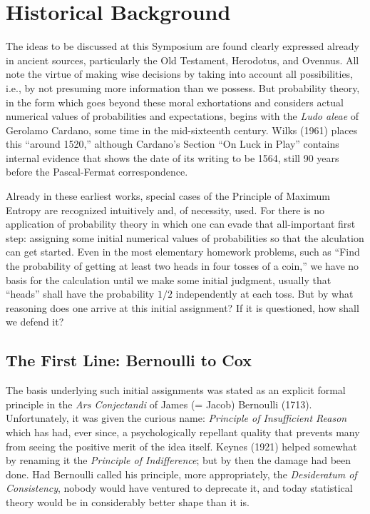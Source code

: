 \section{Historical Background}
\label{sec:A}
The ideas to be discussed at this Symposium are found clearly expressed already in ancient sources, particularly the Old Testament, Herodotus, and Ovennus.
All note the virtue of making wise decisions by taking into account all possibilities, i.e., by not presuming more information than we possess.
But probability theory, in the form which goes beyond these moral exhortations and considers actual numerical values of probabilities and expectations, begins with the \emph{Ludo aleae} of Gerolamo Cardano, some time in the mid-sixteenth century.
Wilks (\cite{wilks}{1961}) places this ``around 1520,'' although Cardano’s Section ``On Luck in Play'' contains internal evidence that shows the date of its writing to be 1564, still 90 years before the Pascal-Fermat correspondence.

Already in these earliest works, special cases of the Principle of Maximum Entropy are recognized intuitively and, of necessity, used.
For there is no application of probability theory in which one can evade that all-important first step: assigning some initial numerical values of probabilities so that the alculation can get started.
Even in the most elementary homework problems, such as ``Find the probability of getting at least two heads in four tosses of a coin,'' we have no basis for the calculation until we make some initial judgment, usually that ``heads'' shall have the probability $1/2$ independently at each toss.
But by what reasoning does one arrive at this initial assignment?
If it is questioned, how shall we defend it?

\subsection{The First Line: Bernoulli to Cox}
The basis underlying such initial assignments was stated as an explicit formal principle in the \emph{Ars Conjectandi} of James (= Jacob) Bernoulli (1713).
Unfortunately, it was given the curious name: \emph{Principle of Insufficient Reason} which has had, ever since, a psychologically repellant quality that prevents many from seeing the positive merit of the idea itself.
Keynes (\cite{keynes}{1921}) helped somewhat by renaming it the \emph{Principle of Indifference}; but by then the damage had been done.
Had Bernoulli called his principle, more appropriately, the \emph{Desideratum of Consistency}, nobody would have ventured to deprecate it, and today statistical theory would be in considerably better shape than it is.

